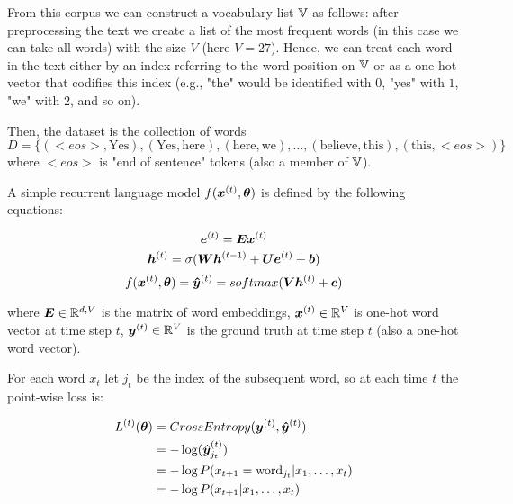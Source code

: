 From this corpus we can construct a vocabulary list $\mathbb{V}$ as follows: after preprocessing the text we create a list of the most frequent words (in this case we can take all words) with the size $V$ (here $V=27$). Hence, we can treat each word in the text either by an index referring to the word position on $\mathbb{V}$ or as a one-hot vector that codifies this index (e.g., "the" would be identified with $0$, "yes" with $1$, "we" with $2$, and so on).

Then, the dataset is the collection of words 
\[
D = \{(<eos>, \text{Yes}), (\text{Yes}, \text{here}), (\text{here}, \text{we}),\dots,(\text{believe}, \text{this}), (\text{this}, <eos>)\}
\]
where $<eos>$ is "end of sentence" tokens (also a member of $\mathbb{V}$).

A simple recurrent language model $f(\bm{x}^{(t)}, \bm{\theta})$ is defined by the following equations:

\begin{equation}
\bm{e}^{(t)} = \bm{E}\bm{x}^{(t)}
\end{equation}
\vspace{0.2cm}
\begin{equation}
\bm{h}^{(t)} = \sigma(\bm{W}\bm{h}^{(t-1)}+ \bm{U}\bm{e}^{(t)}+ \bm{b})
\end{equation}
\vspace{0.2cm}
\begin{equation}
f(\bm{x}^{(t)}, \bm{\theta}) = \bm{\hat{y}}^{(t)} = softmax(\bm{V}\bm{h}^{(t)} + \bm{c})
\end{equation}

where $\bm{E} \in \mathbb{R}^{d,V}$ is the matrix of word embeddings, $\bm{x}^{(t)} \in \mathbb{R}^{V}$ is one-hot word vector at time step $t$, $\bm{y}^{(t)} \in \mathbb{R}^{V}$ is the ground truth at time step $t$ (also a one-hot word vector).

For each word $x_t$ let $j_t$ be the index of the subsequent word, so at each time $t$ the point-wise loss is:

\begin{align}
\label{lossCE}
L^{(t)}(\bm{\theta}) &= CrossEntropy(\bm{y}^{(t)},\bm{\hat{y}}^{(t)})\\
    &= - \log({\bm{\hat{y}}^{(t)}}_{j_t})\\
        &= - \log P(x_{t+1} = \text{word}_{j_t}|x_{1}, \dots, x_{t})\\
        &= - \log P(x_{t+1}|x_{1}, \dots, x_{t})
\end{align}

